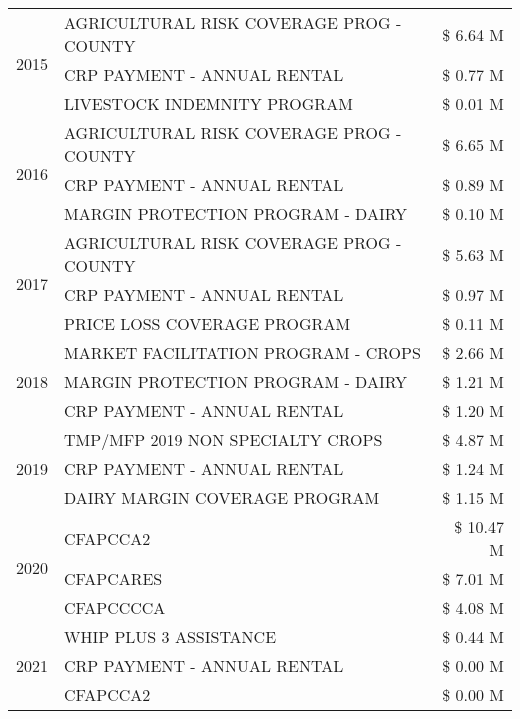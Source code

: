 \begin{tabular}{llr}
\cline{1-3}
\multirow[t]{3}{*}{2015} & AGRICULTURAL RISK COVERAGE PROG - COUNTY & \$ 6.64 M \\
 & CRP PAYMENT - ANNUAL RENTAL & \$ 0.77 M \\
 & LIVESTOCK INDEMNITY PROGRAM & \$ 0.01 M \\
\cline{1-3}
\multirow[t]{3}{*}{2016} & AGRICULTURAL RISK COVERAGE PROG - COUNTY & \$ 6.65 M \\
 & CRP PAYMENT - ANNUAL RENTAL & \$ 0.89 M \\
 & MARGIN PROTECTION PROGRAM - DAIRY & \$ 0.10 M \\
\cline{1-3}
\multirow[t]{3}{*}{2017} & AGRICULTURAL RISK COVERAGE PROG - COUNTY & \$ 5.63 M \\
 & CRP PAYMENT - ANNUAL RENTAL & \$ 0.97 M \\
 & PRICE LOSS COVERAGE PROGRAM & \$ 0.11 M \\
\cline{1-3}
\multirow[t]{3}{*}{2018} & MARKET FACILITATION PROGRAM - CROPS & \$ 2.66 M \\
 & MARGIN PROTECTION PROGRAM - DAIRY & \$ 1.21 M \\
 & CRP PAYMENT - ANNUAL RENTAL & \$ 1.20 M \\
\cline{1-3}
\multirow[t]{3}{*}{2019} & TMP/MFP 2019 NON SPECIALTY CROPS & \$ 4.87 M \\
 & CRP PAYMENT - ANNUAL RENTAL & \$ 1.24 M \\
 & DAIRY MARGIN COVERAGE PROGRAM & \$ 1.15 M \\
\cline{1-3}
\multirow[t]{3}{*}{2020} & CFAPCCA2 & \$ 10.47 M \\
 & CFAPCARES & \$ 7.01 M \\
 & CFAPCCCCA & \$ 4.08 M \\
\cline{1-3}
\multirow[t]{3}{*}{2021} & WHIP PLUS 3 ASSISTANCE & \$ 0.44 M \\
 & CRP PAYMENT - ANNUAL RENTAL & \$ 0.00 M \\
 & CFAPCCA2 & \$ 0.00 M \\
\cline{1-3}
\bottomrule
\end{tabular}
